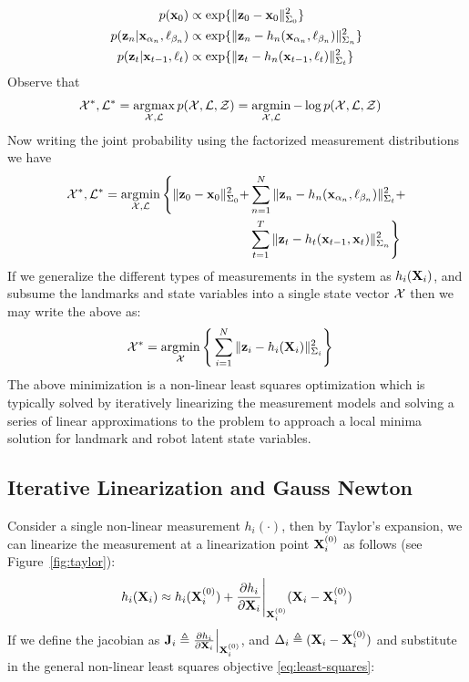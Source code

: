 \begin{align}
    p(\mathbf{x}_0) &\propto \exp\{ \|\mathbf{z}_0 - \mathbf{x}_0\|^2_{\Sigma_0}\}\\
    p(\mathbf{z}_n | \mathbf{x}_{\alpha_n}, \ell_{\beta_n}) &\propto \exp\{ \|\mathbf{z}_n - h_n(\mathbf{x}_{\alpha_n}, \ell_{\beta_n})\|^2_{\Sigma_n}\}\\
    p(\mathbf{z}_t | \mathbf{x}_{t-1}, \ell_{t}) &\propto \exp\{ \|\mathbf{z}_t - h_n(\mathbf{x}_{t-1}, \ell_{t})\|^2_{\Sigma_t}\}
\end{align}
Observe that
\begin{align}
    \mathcal{X}^*, \mathcal{L}^* &= \operatorname*{\arg\!\max}_{\mathcal{X}, \mathcal{L}} p(\mathcal{X}, \mathcal{L}, \mathcal{Z}) = \operatorname*{\arg\!\min}_{\mathcal{X}, \mathcal{L}} - \log p(\mathcal{X}, \mathcal{L}, \mathcal{Z})
\end{align}
Now writing the joint probability using the factorized measurement distributions we have
\begin{align*}
    \mathcal{X}^*, \mathcal{L}^* = \operatorname*{\arg\!\min}_{\mathcal{X}, \mathcal{L}} \Bigg \{ \| \mathbf{z}_0 - \mathbf{x}_0 \|_{\Sigma_0}^2 + &\sum_{n=1}^{N} \| \mathbf{z}_n - h_n(\mathbf{x}_{\alpha_n}, \ell_{\beta_n}) \|_{\Sigma_t}^2 + \\&\sum_{t=1}^{T}\| \mathbf{z}_t - h_t(\mathbf{x}_{t-1}, \mathbf{x}_{t}) \|_{\Sigma_n}^2 \Bigg \}
\end{align*}
If we generalize the different types of measurements in the system as $h_i(\mathbf{X}_i)$, and subsume the landmarks and state variables into a single state vector $\mathcal{X}$ then we may write the above as:
\begin{align}
    \mathcal{X}^* = \operatorname*{\arg\!\min}_{\mathcal{X}} \Bigg \{ &\sum_{i=1}^{N} \| \mathbf{z}_i - h_i(\mathbf{X}_i) \|_{\Sigma_i}^2 \Bigg \} \label{eq:least-squares}
\end{align}
The above minimization is a non-linear least squares optimization which is typically solved by iteratively linearizing the measurement models and solving a series of linear approximations to the problem to approach a local minima solution for landmark and robot latent state variables.

\subsection{Iterative Linearization and Gauss Newton}


Consider a single non-linear measurement $h_i( \cdot )$, then by Taylor's expansion, we can linearize the measurement at a linearization point $\mathbf{X}_i^{(0)}$ as follows (see Figure~\ref{fig:taylor}):
\begin{align}
    h_i(\mathbf{X}_i) \approx h_i(\mathbf{X}_i^{(0)}) + \frac{\partial h_i}{\partial \mathbf{X}_i} \Bigg |_{\mathbf{X}_i^{(0)}} (\mathbf{X}_i - \mathbf{X}_i^{(0)})
\end{align}
If we define the jacobian as $\mathbf{J}_i \triangleq \frac{\partial h_i}{\partial \mathbf{X}_i} \Big|_{\mathbf{X}_i^{(0)}}$, and $\Delta_i \triangleq (\mathbf{X}_i - \mathbf{X}_i^{(0)})$ and substitute in the general non-linear least squares objective \ref{eq:least-squares}:

